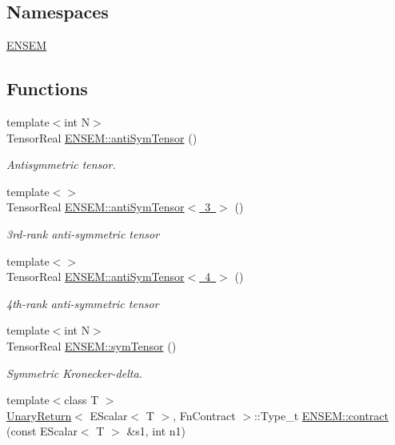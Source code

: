\subsection*{Namespaces}
\begin{DoxyCompactItemize}
\item 
 \mbox{\hyperlink{namespaceENSEM}{E\+N\+S\+EM}}
\end{DoxyCompactItemize}
\subsection*{Functions}
\begin{DoxyCompactItemize}
\item 
{\footnotesize template$<$int N$>$ }\\Tensor\+Real \mbox{\hyperlink{namespaceENSEM_aee2482527c2e020e327d542d07e92dee}{E\+N\+S\+E\+M\+::anti\+Sym\+Tensor}} ()
\begin{DoxyCompactList}\small\item\em Antisymmetric tensor. \end{DoxyCompactList}\item 
{\footnotesize template$<$$>$ }\\Tensor\+Real \mbox{\hyperlink{namespaceENSEM_a4ce86ea9e03a33e62daa145e7832fa29}{E\+N\+S\+E\+M\+::anti\+Sym\+Tensor$<$ 3 $>$}} ()
\begin{DoxyCompactList}\small\item\em 3rd-\/rank anti-\/symmetric tensor \end{DoxyCompactList}\item 
{\footnotesize template$<$$>$ }\\Tensor\+Real \mbox{\hyperlink{namespaceENSEM_a6065b3f3c5f3e116256e3897ce3ca1d5}{E\+N\+S\+E\+M\+::anti\+Sym\+Tensor$<$ 4 $>$}} ()
\begin{DoxyCompactList}\small\item\em 4th-\/rank anti-\/symmetric tensor \end{DoxyCompactList}\item 
{\footnotesize template$<$int N$>$ }\\Tensor\+Real \mbox{\hyperlink{namespaceENSEM_a4b7b45dcc2e93e939b6662956efaf3d6}{E\+N\+S\+E\+M\+::sym\+Tensor}} ()
\begin{DoxyCompactList}\small\item\em Symmetric Kronecker-\/delta. \end{DoxyCompactList}\item 
{\footnotesize template$<$class T $>$ }\\\mbox{\hyperlink{structUnaryReturn}{Unary\+Return}}$<$ E\+Scalar$<$ T $>$, Fn\+Contract $>$\+::Type\+\_\+t \mbox{\hyperlink{namespaceENSEM_a8a53ef224c8fabaae4e9319588554b96}{E\+N\+S\+E\+M\+::contract}} (const E\+Scalar$<$ T $>$ \&s1, int n1)

\end{DoxyCompactItemize}
